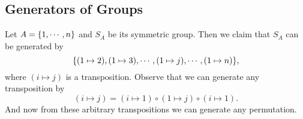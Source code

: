 \subsection{Generators of Groups}
\begin{summary}
	Let $ A = \{1,\cdots,n\} $ and $ S_A $ be its symmetric group. Then we claim that $ S_A $ can be generated by 
	\[ \{(1\mapsto2), (1\mapsto 3), \cdots, (1\mapsto j), \cdots, (1\mapsto n)\}, \]
	where $ (i\mapsto j) $ is a transposition. Observe that we can generate any transposition by
	\[ (i\mapsto j) = (i\mapsto 1) \circ (1\mapsto j) \circ (i\mapsto 1). \]
	And now from these arbitrary transpositions we can generate any permutation.
\end{summary}

